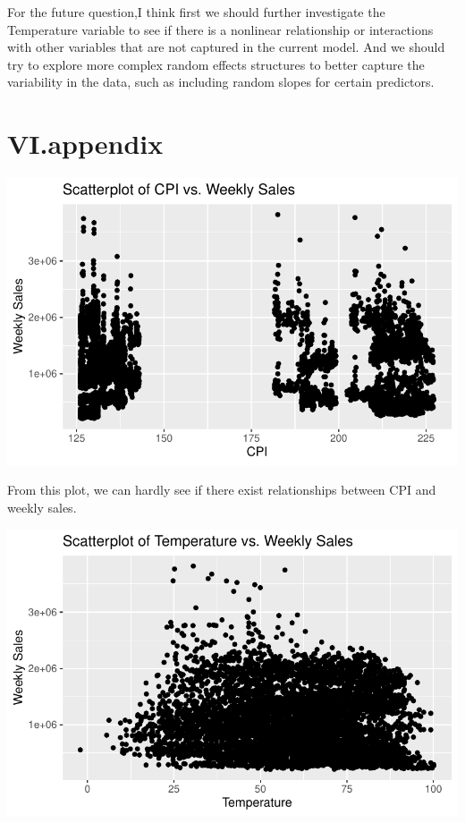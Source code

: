 \documentclass[
  letterpaper,
  DIV=11,
  numbers=noendperiod]{scrartcl}
\begin{document}
For the future question,I think first we should further investigate the
Temperature variable to see if there is a nonlinear relationship or
interactions with other variables that are not captured in the current
model. And we should try to explore more complex random effects
structures to better capture the variability in the data, such as
including random slopes for certain predictors.

\hypertarget{vi.appendix}{%
\section{VI.appendix}\label{vi.appendix}}

\includegraphics{678final_files/figure-pdf/unnamed-chunk-18-1.pdf}

From this plot, we can hardly see if there exist relationships between
CPI and weekly sales.

\includegraphics{678final_files/figure-pdf/unnamed-chunk-19-1.pdf}
\end{document}
